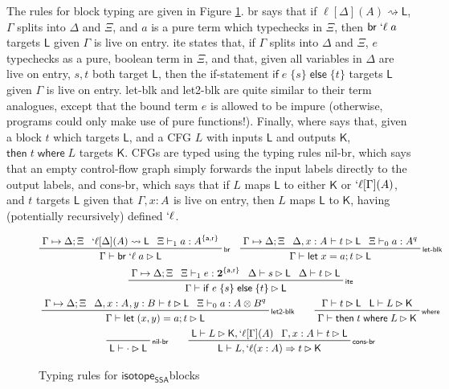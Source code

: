 \documentclass[acmsmall,screen,review]{acmart}
\newcommand{\mb}[1]{\ensuremath{\mathbf{#1}}}
\newcommand{\ms}[1]{\ensuremath{\mathsf{#1}}}
\newcommand{\lbl}[1]{{`#1}}
\newcommand{\lto}{\Rightarrow}
\newcommand{\letstmt}[3]{\ensuremath{\ms{let}\;#1 = #2; #3}}
\newcommand{\brb}[2]{\ms{br}\;#1\;#2}
\newcommand{\lbrb}[2]{\brb{\lbl{#1}}{#2}}
\newcommand{\ite}[3]{\ms{if}\;#1\;\{#2\}\;\ms{else}\;\{#3\}}
\newcommand{\ewhere}[2]{\ms{then}\;#1\;\ms{where}\;#2}
\newcommand{\wbranch}[3]{#1(#2) \lto #3}
\newcommand{\lwbranch}[3]{\wbranch{\lbl{#1}}{#2}{#3}}
\newcommand{\csplits}[3]{#1 \mapsto #2;#3}
\newcommand{\lwk}[2]{#1 \rightsquigarrow #2}
\newcommand{\thyp}[3]{#1: {#2}^{#3}}
\newcommand{\lhyp}[3]{#1[#2](#3)}
\newcommand{\llhyp}[3]{\lhyp{\lbl{#1}}{#2}{#3}}
\newcommand{\rle}[1]{{\scriptsize\textsf{#1}}}
\newcommand{\tint}{{\{\ms{a}, \ms{r}\}}}
\newcommand{\hasty}[5]{#1 \vdash_{#2} #3: {#4}^{#5}}
\newcommand{\haslb}[3]{#1 \vdash #2 \rhd #3}
\newcommand{\lhaslb}[3]{#1 \vdash #2 \rhd #3}
\newcommand{\isotopessa}{\ms{isotope_{SSA}}}
\begin{document}
The rules for block typing are given in Figure \ref{fig:ssa-block-typing}.
\rle{br} says that if \(\lwk{\lhyp{\ell}{\Delta}{A}}{\ms{L}}\), \(\Gamma\)
splits into \(\Delta\) and \(\Xi\), and \(a\) is a pure term which typechecks in
\(\Xi\), then \(\lbrb{\ell}{a}\) targets \(\ms{L}\) given \(\Gamma\) is live on
entry. \rle{ite} states that, if \(\Gamma\) splits into \(\Delta\) and \(\Xi\),
\(e\) typechecks as a pure, boolean term in \(\Xi\), and that, given all
variables in \(\Delta\) are live on entry, \(s, t\) both target \(\ms{L}\), then
the if-statement \(\ite{e}{s}{t}\) targets \(\ms{L}\) given \(\Gamma\) is live
on entry. \rle{let-blk} and \rle{let2-blk} are quite similar to their term
analogues, except that the bound term \(e\) is allowed to be impure (otherwise,
programs could only make use of pure functions!). Finally, \rle{where} says
that, given a block \(t\) which targets \(\ms{L}\), and a CFG \(L\) with inputs
\(\ms{L}\) and outputs \(\ms{K}\), \(\ewhere{t}{L}\) targets \(\ms{K}\). CFGs
are typed using the typing rules \rle{nil-br}, which says that an empty
control-flow graph simply forwards the input labels directly to the output
labels, and \rle{cons-br}, which says that if \(L\) maps \(\ms{L}\) to either
\(\ms{K}\) or \(\lbl{\ell}[\Gamma](A)\), and \(t\) targets \(\ms{L}\) given that
\(\Gamma, \thyp{x}{A}{}\) is live on entry, then \(L\) maps \(\ms{L}\) to
\(\ms{K}\), having (potentially recursively) defined \(\lbl{\ell}\).

\begin{figure}
  \begin{gather*}    
    \prftree[r]{\rle{br}}
      {\csplits{\Gamma}{\Delta}{\Xi}}
      {\lwk{\llhyp{\ell}{\Delta}{A}}{\ms{L}}}
      {\hasty{\Xi}{1}{a}{A}{\tint}}
      {\haslb{\Gamma}{\lbrb{\ell}{a}}{\ms{L}}} 
    \quad
    \prftree[r]{\rle{let-blk}}
      {\csplits{\Gamma}{\Delta}{\Xi}}
      {\haslb{\Delta, \thyp{x}{A}{}}{t}{\ms{L}}}
      {\hasty{\Xi}{0}{a}{A}{q}}
      {\haslb{\Gamma}{\letstmt{x}{a}{t}}{\ms{L}}} 
    \\
    \prftree[r]{\rle{ite}}
      {\csplits{\Gamma}{\Delta}{\Xi}}
      {\hasty{\Xi}{1}{e}{\mb{2}}{\tint}}
      {\haslb{\Delta}{s}{\ms{L}}}
      {\haslb{\Delta}{t}{\ms{L}}}
      {\haslb{\Gamma}{\ite{e}{s}{t}}{\ms{L}}} 
    \\
    \prftree[r]{\rle{let2-blk}}
      {\csplits{\Gamma}{\Delta}{\Xi}}
      {\haslb{\Delta, \thyp{x}{A}{}, \thyp{y}{B}{}}{t}{\ms{L}}}
      {\hasty{\Xi}{0}{a}{A \otimes B}{q}}
      {\haslb{\Gamma}{\letstmt{(x, y)}{a}{t}}{\ms{L}}} \qquad
    \prftree[r]{\rle{where}}
      {\haslb{\Gamma}{t}{\ms{L}}}
      {\lhaslb{\ms{L}}{L}{\ms{K}}}
      {\haslb{\Gamma}{\ewhere{t}{L}}{\ms{K}}}
    \\
    \prftree[r]{\rle{nil-br}}
      {\lhaslb{\ms{L}}{\cdot}{\ms{L}}} \qquad
    \prftree[r]{\rle{cons-br}}
      {\lhaslb{\ms{L}}{L}{\ms{K}, \llhyp{\ell}{\Gamma}{A}}}
      {\haslb{\Gamma, \thyp{x}{A}{}}{t}{\ms{L}}}
      {\lhaslb{\ms{L}}{L, \lwbranch{\ell}{x: A}{t}}{\ms{K}}}
  \end{gather*}
  \caption{Typing rules for \isotopessa blocks}
  \label{fig:ssa-block-typing}
\end{figure}
\end{document}
